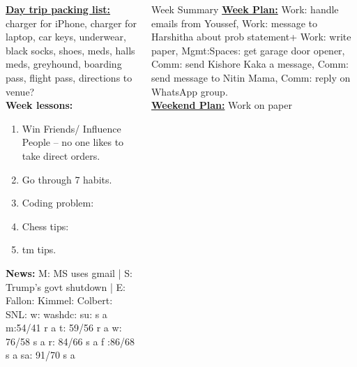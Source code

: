\begin{columns}
\begin{column}{0.25\linewidth}
      \begin{block}
        
      {\underline{\bf Day trip packing list:} charger for iPhone,
        charger for laptop, car keys, underwear, black socks, shoes,
        meds, halls meds, greyhound, boarding pass, flight pass, directions to
        venue?} \\ 
      {\tiny {\bf Week lessons:}} \\ 
      \begin{enumerate}
        \tiny \item \tiny Win Friends/ Influence People – no one
        likes to take direct orders.
      \item \tiny Go through 7 habits.
      \item \tiny Coding problem: 
      \item \tiny Chess tips: 
      \item \tiny tm tips.
      \end{enumerate}
          {{\tiny {\bf News:}} M: MS uses gmail | S:  Trump's govt shutdown | E:
            Fallon:   Kimmel:  Colbert: SNL:
            w: washdc: 
            {su: { s a}}
            {m:{54/41 r a}}
            {t: {59/56 r a}} 
            {w: {76/58 s a}} 
            {r: {84/66 s a}}
            {f :{86/68 s a} }
            {sa: {91/70 s a}}}
    \end{block} 

  \end{column}
  \begin{column}{0.5\linewidth}
    \begin{block}{Week Summary} 
      {\underline {\bf Week Plan:}
        Work: handle emails from Youssef,
        Work: message to Harshitha about prob statement+ Work: write
        paper, Mgmt:Spaces: get garage door opener, Comm: send Kishore
      Kaka a message, Comm: send message to Nitin Mama, Comm: reply on
      WhatsApp group.
} \\ 
      {\underline{\bf Weekend Plan:} Work on paper }\\
    \end{block}


\end{column}
\end{columns}
